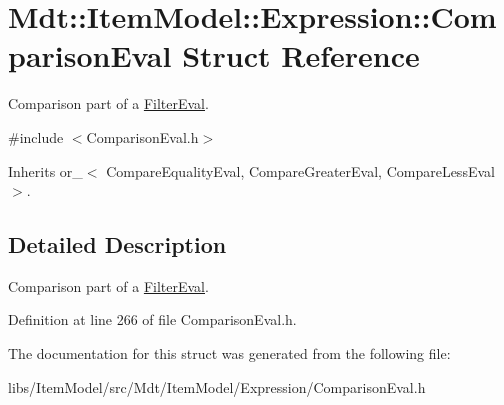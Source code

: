 \hypertarget{struct_mdt_1_1_item_model_1_1_expression_1_1_comparison_eval}{}\section{Mdt\+:\+:Item\+Model\+:\+:Expression\+:\+:Comparison\+Eval Struct Reference}
\label{struct_mdt_1_1_item_model_1_1_expression_1_1_comparison_eval}


Comparison part of a \hyperlink{struct_mdt_1_1_item_model_1_1_expression_1_1_filter_eval}{Filter\+Eval}.  




{\ttfamily \#include $<$Comparison\+Eval.\+h$>$}



Inherits or\+\_\+$<$ Compare\+Equality\+Eval, Compare\+Greater\+Eval, Compare\+Less\+Eval $>$.



\subsection{Detailed Description}
Comparison part of a \hyperlink{struct_mdt_1_1_item_model_1_1_expression_1_1_filter_eval}{Filter\+Eval}. 

Definition at line 266 of file Comparison\+Eval.\+h.



The documentation for this struct was generated from the following file\+:\begin{DoxyCompactItemize}
\item 
libs/\+Item\+Model/src/\+Mdt/\+Item\+Model/\+Expression/Comparison\+Eval.\+h\end{DoxyCompactItemize}

